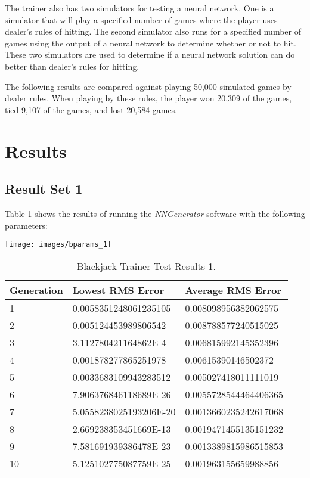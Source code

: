 The trainer also has two simulators for testing a neural network.
One is a simulator that will play a specified number of games where
the player uses dealer's rules of hitting.
The second simulator also runs for a specified number of games using
the output of a neural network to determine whether or not to hit.
These two simulators are used to determine if a neural network
solution can do better than dealer's rules for hitting.

The following results are compared against playing 50,000 simulated
games by dealer rules. 
When playing by these rules, the player won 20,309 of the games, tied 9,107 of
the games, and lost 20,584 games.

\section{Results}

\subsection{Result Set 1}

Table \ref{btr1} shows the results of running the {\it NNGenerator} software with the following parameters:

\begin{center}
\texttt{[image: images/bparams\_1]}
\end{center}

\begin{center}
    \begin{longtable}{ | l | l | l |}
      \caption{Blackjack Trainer Test Results 1.} \label{btr1} \\
   \hline
  Generation & Lowest RMS Error & Average RMS Error \\ \hline
1 &	0.0058351248061235105 &	0.008098956382062575 \\ \hline
2 &	0.005124453989806542 &	0.008788577240515025 \\ \hline
3 &	3.112780421164862E-4 &	0.006815992145352396 \\ \hline
4 &	0.001878277865251978 &	0.00615390146502372 \\ \hline
5 &	0.0033683109943283512 &	0.005027418011111019 \\ \hline
6 &	7.906376846118689E-26 &	0.0055728544464406365 \\ \hline
7 &	5.0558238025193206E-20 &	0.0013660235242617068 \\ \hline
8 &	2.669238353451669E-13 &	0.0019471455135151232 \\ \hline
9 &	7.581691939386478E-23 &	0.0013389815986515853 \\ \hline
10 &	5.125102775087759E-25 &	0.001963155659988856 \\ \hline
\end{longtable}
\end{center}

